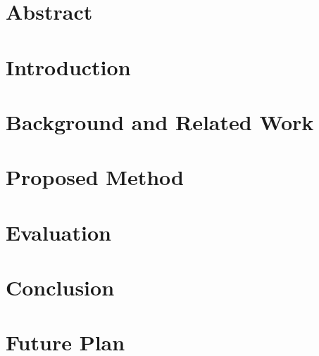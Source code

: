 \documentclass[11pt,a4paper]{report}
\begin{document}
\listoffigures
\thispagestyle{empty}
\pagebreak



\chapter*{\centering Abstract}
\thispagestyle{empty}
\pagebreak






\chapter{Introduction}

\pagebreak



\chapter{Background and Related Work}
\pagebreak



\chapter{Proposed Method}
\pagebreak



\chapter{Evaluation}
\pagebreak



\chapter{Conclusion}
\pagebreak



\chapter{Future Plan}
\pagebreak



 

\end{document}
